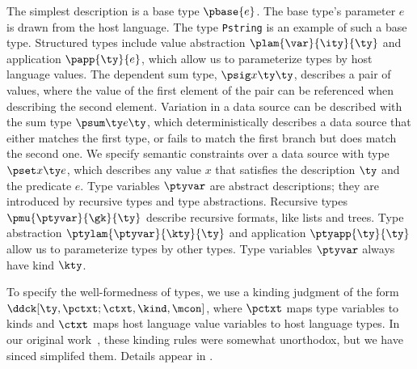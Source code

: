 The simplest description is a base type $\pbase{e}$.
The base type's parameter $e$ is drawn from the host language. 
The \padsml{} type {\tt Pstring} is an example of such a base type.
Structured types include value abstraction $\plam{\var}{\ity}{\ty}$
and application $\papp{\ty}{e}$, which allow us to parameterize types
by host language values. 
The dependent sum type, $\psig x \ty \ty$, describes a pair of values,
where the value of the first element of the pair can be referenced
when describing the second element.  Variation in a data source can be
described with the sum type $\psum \ty e \ty$, which deterministically
describes a data source that either matches the first type, or fails
to match the first branch but does match the second one.
We specify semantic constraints over a data source
with type $\pset x \ty e$, which describes any value $x$ that satisfies the
description $\ty$ and the predicate $e$. Type variables $\ptyvar$ are
abstract descriptions; they are introduced by recursive types and type
abstractions. Recursive types $\pmu{\ptyvar}{\gk}{\ty}$ describe
recursive formats, like lists and trees. Type abstraction
$\ptylam{\ptyvar}{\kty}{\ty}$ and application $\ptyapp{\ty}{\ty}$
allow us to parameterize types by other types.  Type variables $\ptyvar$
always have kind $\kty$.

To specify the well-formedness of types, 
we use a kinding judgment of the form
$\ddck[\ty,\pctxt;\ctxt,\kind,\mcon]$,
where $\pctxt$ maps type variables 
to kinds and $\ctxt$ maps host language value variables to host language 
types. In our original work~\cite{fisher+:next700ddl}, these kinding rules
were somewhat unorthodox, but we have sinced simplifed them.  
Details appear in .

